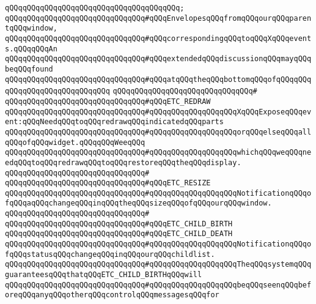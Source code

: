 \verb|qQQqqQQqqQQqqQQqqQQqqQQqqQQqqQQqqQQqqQQq;|\newline
\newline
\verb|qQQqqQQqqQQqqQQqqQQqqQQqqQQqqQQq#qQQqEnvelopesqQQqfromqQQqourqQQqparentqQQqwindow,|\newline
\verb|qQQqqQQqqQQqqQQqqQQqqQQqqQQqqQQq#qQQqcorrespondingqQQqtoqQQqXqQQqevents.qQQqqQQqAn|\newline
\verb|qQQqqQQqqQQqqQQqqQQqqQQqqQQqqQQq#qQQqextendedqQQqdiscussionqQQqmayqQQqbeqQQqfound|\newline
\verb|qQQqqQQqqQQqqQQqqQQqqQQqqQQqqQQq#qQQqatqQQqtheqQQqbottomqQQqofqQQqqQQqqQQqqQQq|\verb|qQQqqQQqqQQqqQQq|\newline
\verb|qQQqqQQqqQQqqQQqqQQqqQQqqQQqqQQq#|\newline
\verb|qQQqqQQqqQQqqQQqqQQqqQQqqQQqqQQq#qQQqETC_REDRAW|\newline
\verb|qQQqqQQqqQQqqQQqqQQqqQQqqQQqqQQq#qQQqqQQqqQQqqQQqqQQqXqQQqExposeqQQqevent:qQQqNeedqQQqtoqQQqredrawqQQqindicatedqQQqparts|\newline
\verb|qQQqqQQqqQQqqQQqqQQqqQQqqQQqqQQq#qQQqqQQqqQQqqQQqqQQqorqQQqelseqQQqallqQQqofqQQqwidget.qQQqqQQqWeeqQQq|\newline
\verb|qQQqqQQqqQQqqQQqqQQqqQQqqQQqqQQq#qQQqqQQqqQQqqQQqqQQqwhichqQQqweqQQqneedqQQqtoqQQqredrawqQQqtoqQQqrestoreqQQqtheqQQqdisplay.|\newline
\verb|qQQqqQQqqQQqqQQqqQQqqQQqqQQqqQQq#|\newline
\verb|qQQqqQQqqQQqqQQqqQQqqQQqqQQqqQQq#qQQqETC_RESIZE|\newline
\verb|qQQqqQQqqQQqqQQqqQQqqQQqqQQqqQQq#qQQqqQQqqQQqqQQqqQQqNotificationqQQqofqQQqaqQQqchangeqQQqinqQQqtheqQQqsizeqQQqofqQQqourqQQqwindow.|\newline
\verb|qQQqqQQqqQQqqQQqqQQqqQQqqQQqqQQq#|\newline
\verb|qQQqqQQqqQQqqQQqqQQqqQQqqQQqqQQq#qQQqETC_CHILD_BIRTH|\newline
\verb|qQQqqQQqqQQqqQQqqQQqqQQqqQQqqQQq#qQQqETC_CHILD_DEATH|\newline
\verb|qQQqqQQqqQQqqQQqqQQqqQQqqQQqqQQq#qQQqqQQqqQQqqQQqqQQqNotificationqQQqofqQQqstatusqQQqchangeqQQqinqQQqourqQQqchildlist.|\newline
\verb|qQQqqQQqqQQqqQQqqQQqqQQqqQQqqQQq#qQQqqQQqqQQqqQQqqQQqTheqQQqsystemqQQqguaranteesqQQqthatqQQqETC_CHILD_BIRTHqQQqwill|\newline
\verb|qQQqqQQqqQQqqQQqqQQqqQQqqQQqqQQq#qQQqqQQqqQQqqQQqqQQqbeqQQqseenqQQqbeforeqQQqanyqQQqotherqQQqcontrolqQQqmessagesqQQqfor|\newline
